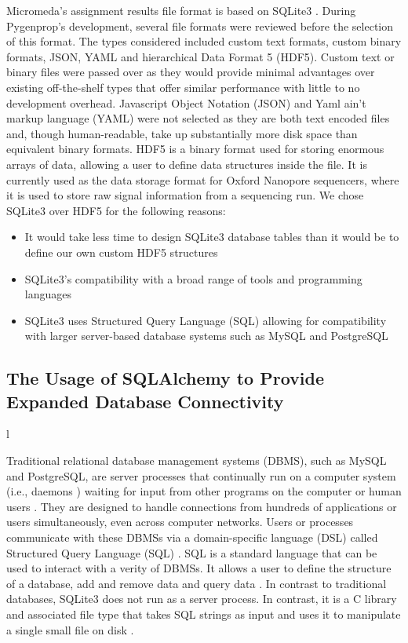 Micromeda's assignment results file format is based on SQLite3 \cite{owens2006definitive}. During Pygenprop's development, several file formats were reviewed before the selection of this format. The types considered included custom text formats, custom binary formats, JSON, YAML and hierarchical Data Format 5 (HDF5). Custom text or binary files were passed over as they would provide minimal advantages over existing off-the-shelf types that offer similar performance with little to no development overhead. Javascript Object Notation (JSON) and Yaml ain't markup language (YAML) \cite{ben2005yaml} were not selected as they are both text encoded files and, though human-readable, take up substantially more disk space than equivalent binary formats. HDF5 \cite{folk2011overview} is a binary format used for storing enormous arrays of data, allowing a user to define data structures inside the file. It is currently used as the data storage format for Oxford Nanopore sequencers, where it is used to store raw signal information from a sequencing run. We chose SQLite3 over HDF5 for the following reasons:
\begin{itemize}
\item It would take less time to design SQLite3 database tables than it would be to define our own custom HDF5 structures
\item SQLite3's compatibility with a broad range of tools and programming languages
\item SQLite3 uses Structured Query Language (SQL) allowing for compatibility with larger server-based database systems such as MySQL \cite{dubois1999mysql} and PostgreSQL \cite{momjian2001postgresql, owens2006definitive}
\end{itemize}

\subsection{The Usage of SQLAlchemy to Provide Expanded Database Connectivity} \label{SQLAlchemy}l

Traditional relational database management systems (DBMS), such as MySQL and PostgreSQL, are server processes that continually run on a computer system (i.e., daemons \cite{martin2006computer}) waiting for input from other programs on the computer or human users \cite{dubois1999mysql, momjian2001postgresql}. They are designed to handle connections from hundreds of applications or users simultaneously, even across computer networks. Users or processes communicate with these DBMSs via a domain-specific language (DSL) called Structured Query Language (SQL) \cite{sql1987guide}. SQL is a standard language that can be used to interact with a verity of DBMSs. It allows a user to define the structure of a database, add and remove data and query data \cite{sql1987guide}. In contrast to traditional databases, SQLite3 does not run as a server process. In contrast, it is a C library and associated file type that takes SQL strings as input and uses it to manipulate a single small file on disk \cite{owens2006definitive}.

